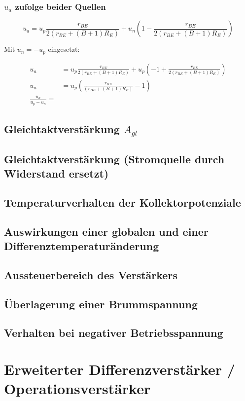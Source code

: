 \subsubsection{$u_a$ zufolge beider Quellen}

\begin{equation}
    u_a = u_p \frac{r_{BE}}{2 \left( r_{BE} + (B+1) R_E \right)} + u_n \left( 1 - \frac{r_{BE}}{2 \left( r_{BE} + (B+1) R_E \right)} \right)
\end{equation}

Mit $u_n = - u_p$ eingesetzt:

\begin{align}
    u_a &= u_p \frac{r_{BE}}{2 \left( r_{BE} + (B+1) R_E \right)} + u_p \left( - 1 + \frac{r_{BE}}{2 \left( r_{BE} + (B+1) R_E \right)} \right)\\
    u_a &= u_p \left(\frac{r_{BE}}{\left( r_{BE} + (B+1) R_E \right)} - 1 \right) \\
    \frac{u_a}{u_p - u_n} = 
\end{align}

\subsection{Gleichtaktverstärkung $A_{gl}$}

\subsection{Gleichtaktverstärkung (Stromquelle durch Widerstand ersetzt)}

\subsection{Temperaturverhalten der Kollektorpotenziale}

\subsection{Auswirkungen einer globalen und einer Differenztemperaturänderung}

\subsection{Aussteuerbereich des Verstärkers}

\subsection{Überlagerung einer Brummspannung}

\subsection{Verhalten bei negativer Betriebsspannung}

\section{Erweiterter Differenzverstärker / Operationsverstärker}





